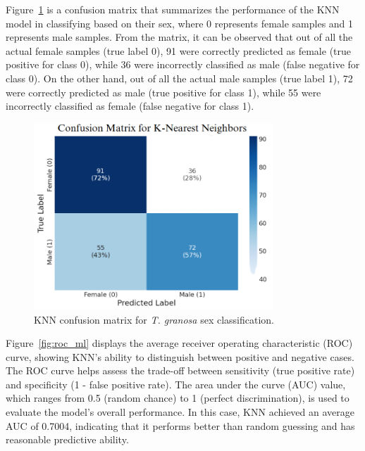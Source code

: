 Figure~\ref{fig:cm_ml} is a confusion matrix that summarizes the performance of the KNN model in classifying \Tgranosa based on their sex, where 0 represents female samples and 1 represents male samples. From the matrix, it can be observed that out of all the actual female samples (true label 0), 91 were correctly predicted as female (true positive for class 0), while 36 were incorrectly classified as male (false negative for class 0). On the other hand, out of all the actual male samples (true label 1), 72 were correctly predicted as male (true positive for class 1), while 55 were incorrectly classified as female (false negative for class 1).

\begin{figure}[!htbp]
	\centering
	\includegraphics[width=0.8\textwidth]{figures/confusion_matrix_ml.png}
	\caption{KNN confusion matrix for \textit{T. granosa} sex classification.}
	\label{fig:cm_ml}
\end{figure}

\newpage
Figure~\ref{fig:roc_ml} displays the average receiver operating characteristic (ROC) curve, showing KNN’s ability to distinguish between positive and negative cases. The ROC curve helps assess the trade-off between sensitivity (true positive rate) and specificity (1 - false positive rate). The area under the curve (AUC) value, which ranges from 0.5 (random chance) to 1 (perfect discrimination), is used to evaluate the model’s overall performance. In this case, KNN achieved an average AUC of 0.7004, indicating that it performs better than random guessing and has reasonable predictive ability.

